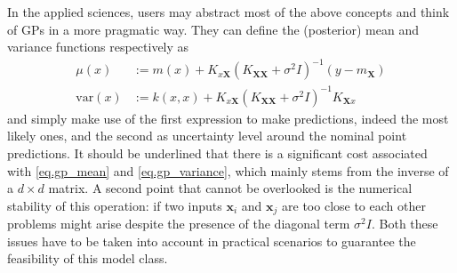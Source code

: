 In the applied sciences, users may abstract most of the above concepts and think of GPs in a more pragmatic way. They can define the (posterior) mean and variance functions respectively as
\begin{align}
	\mu(x) &:= m(x) + K_{x\mathbf{X}} (K_{\mathbf{X}\mathbf{X}} + \sigma^2 I)^{-1} (y-m_\mathbf{X}) \label{eq.gp_mean}\\
	\text{var}(x) &:= k(x,x) + K_{x\mathbf{X}} (K_{\mathbf{X}\mathbf{X}} + \sigma^2 I)^{-1} K_{\mathbf{X}x} \label{eq.gp_variance}
\end{align}
and simply make use of the first expression to make predictions, indeed the most likely ones, and the second as uncertainty level around the nominal point predictions. It should be underlined that there is a significant cost associated with \eqref{eq.gp_mean} and \eqref{eq.gp_variance}, which mainly stems from the inverse of a $d \times d$ matrix. A second point that cannot be overlooked is the numerical stability of this operation: if two inputs $\mathbf{x}_i$ and $\mathbf{x}_j$ are too close to each other problems might arise despite the presence of the diagonal term $\sigma^2 I$. Both these issues have to be taken into account in practical scenarios to guarantee the feasibility of this model class. 


